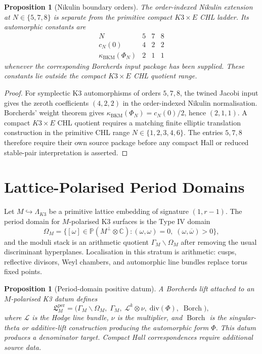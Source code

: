 \documentclass[11pt]{amsart}
\providecommand{\C}{\mathbb{C}}
\providecommand{\Pp}{\mathbb{P}}
\providecommand{\kBKM}{\kappa_{\mathrm{BKM}}}
\theoremstyle{plain}
\newtheorem{proposition}[theorem]{Proposition}
\theoremstyle{definition}
\theoremstyle{remark}
\begin{document}
\begin{proposition}[Nikulin boundary orders]\label{prop:nikulin-boundary-orders}
The order-indexed Nikulin extension at $N\in\{5,7,8\}$ is separate from
the primitive compact $K3\times E$ CHL ladder. Its automorphic constants
are
\[
\begin{array}{c|ccc}
N & 5 & 7 & 8\\
\hline
c_N(0) & 4 & 2 & 2\\
\kBKM(\Phi_N) & 2 & 1 & 1
\end{array}
\]
whenever the corresponding Borcherds input package has been supplied.
These constants lie outside the compact $K3\times E$ CHL quotient
range.
\end{proposition}

\begin{proof}
For symplectic K3 automorphisms of orders $5,7,8$, the twined Jacobi
input gives the zeroth coefficients $(4,2,2)$ in the order-indexed
Nikulin normalisation. Borcherds' weight theorem gives
$\kBKM(\Phi_N)=c_N(0)/2$, hence $(2,1,1)$. A compact
$K3\times E$ CHL quotient requires a matching finite elliptic
translation construction in the primitive CHL range
$N\in\{1,2,3,4,6\}$. The entries $5,7,8$ therefore require their own
source package before any compact Hall or reduced stable-pair
interpretation is asserted.
\end{proof}

\section{Lattice-Polarised Period Domains}

Let $M\hookrightarrow\Lambda_{K3}$ be a primitive lattice embedding of
signature $(1,r-1)$. The period domain for $M$-polarised K3 surfaces is
the Type IV domain
\[
 \Omega_M
 =
 \{[\omega]\in\Pp(M^\perp\otimes\C):
 (\omega,\omega)=0,\;(\omega,\overline\omega)>0\},
\]
and the moduli stack is an arithmetic quotient
$\Gamma_M\backslash \Omega_M$ after removing the usual discriminant
hyperplanes. Localisation in this stratum is arithmetic: cusps,
reflective divisors, Weyl chambers, and automorphic line bundles replace
torus fixed points.

\begin{proposition}[Period-domain positive datum]\label{prop:period-positive-datum}
A Borcherds lift attached to an $M$-polarised K3 datum defines
\[
 \mathfrak L_M^{\mathrm{per}}
 =
 \bigl(\Gamma_M\backslash\Omega_M,\;\Gamma_M,\;\mathcal L^k\otimes\nu,\;
 \mathrm{div}(\Phi),\;\operatorname{Borch}\bigr),
\]
where $\mathcal L$ is the Hodge line bundle, $\nu$ is the multiplier,
and $\operatorname{Borch}$ is the singular-theta or additive-lift
construction producing the automorphic form $\Phi$. This datum produces
a denominator target. Compact Hall correspondences require additional
source data.
\end{proposition}
\end{document}
